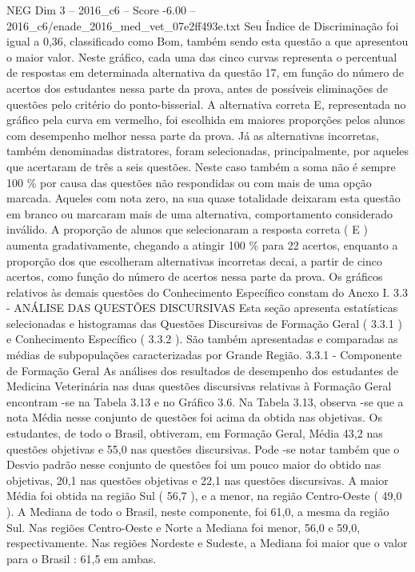 \begin{textsample}{NEG Dim 3 – 2016\_c6 – Score -6.00 – 2016\_c6/enade\_2016\_med\_vet\_07e2ff493e.txt}
Seu Índice de Discriminação foi igual a 0,36, classificado como Bom, também sendo esta questão a que apresentou o maior valor.
Neste gráfico, cada uma das cinco curvas representa o percentual de respostas em determinada alternativa da questão 17, em função do número de acertos dos estudantes nessa parte da prova, antes de possíveis eliminações de questões pelo critério do ponto-bisserial.
A alternativa correta E, representada no gráfico pela curva em vermelho, foi escolhida em maiores proporções pelos alunos com desempenho melhor nessa parte da prova.
Já as alternativas incorretas, também denominadas distratores, foram selecionadas, principalmente, por aqueles que acertaram de três a seis questões.
Neste caso também a soma não é sempre 100 \% por causa das questões não respondidas ou com mais de uma opção marcada.
Aqueles com nota zero, na sua quase totalidade deixaram esta questão em branco ou marcaram mais de uma alternativa, comportamento considerado inválido.
A proporção de alunos que selecionaram a resposta correta ( E ) aumenta gradativamente, chegando a atingir 100 \% para 22 acertos, enquanto a proporção dos que escolheram alternativas incorretas decai, a partir de cinco acertos, como função do número de acertos nessa parte da prova.
Os gráficos relativos às demais questões do Conhecimento Específico constam do Anexo I. 3.3 - ANÁLISE DAS QUESTÕES DISCURSIVAS Esta seção apresenta estatísticas selecionadas e histogramas das Questões Discursivas de Formação Geral ( 3.3.1 ) e Conhecimento Específico ( 3.3.2 ).
São também apresentadas e comparadas as médias de subpopulações caracterizadas por Grande Região. 3.3.1 - Componente de Formação Geral As análises dos resultados de desempenho dos estudantes de Medicina Veterinária nas duas questões discursivas relativas à Formação Geral encontram -se na Tabela 3.13 e no Gráfico 3.6.
Na Tabela 3.13, observa -se que a nota Média nesse conjunto de questões foi acima da obtida nas objetivas.
Os estudantes, de todo o Brasil, obtiveram, em Formação Geral, Média 43,2 nas questões objetivas e 55,0 nas questões discursivas.
Pode -se notar também que o Desvio padrão nesse conjunto de questões foi um pouco maior do obtido nas objetivas, 20,1 nas questões objetivas e 22,1 nas questões discursivas.
A maior Média foi obtida na região Sul ( 56,7 ), e a menor, na região Centro-Oeste ( 49,0 ).
A Mediana de todo o Brasil, neste componente, foi 61,0, a mesma da região Sul.
Nas regiões Centro-Oeste e Norte a Mediana foi menor, 56,0 e 59,0, respectivamente.
Nas regiões Nordeste e Sudeste, a Mediana foi maior que o valor para o Brasil : 61,5 em ambas.

\end{textsample}
